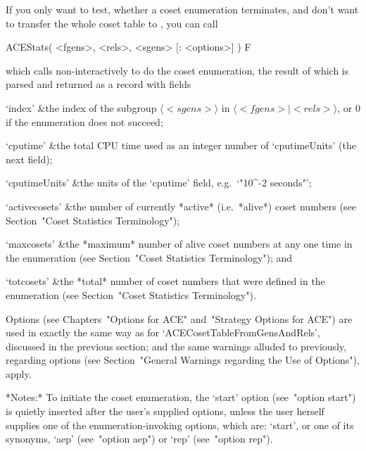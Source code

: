 
If you only want to  test, whether a coset enumeration terminates, and
don't want to  transfer the whole coset table  to {\GAP}, you can call

\>ACEStats( <fgens>, <rels>, <sgens> [: <options>] ) F

which calls {\ACE} non-interactively to do the coset enumeration,  the
result of which is parsed and returned as a {\GAP} record with fields

\beginitems

\quad`index' &the index of the subgroup $\langle <sgens>  \rangle$  in
$\langle <fgens> \mid <rels> \rangle$, or $0$ if the enumeration  does
not succeed;

\quad`cputime' &the total CPU  time  used  as  an  integer  number  of
`cputimeUnits' (the next field);

\quad`cputimeUnits' &the units of the  `cputime'  field,  e.g.~`"10^-2
seconds"';

\quad`activecosets' &the number of currently  *active*  (i.e.~*alive*)
coset numbers (see Section~"Coset Statistics Terminology");

\quad`maxcosets' &the *maximum* number of alive coset numbers  at  any
one  time  in   the   enumeration   (see   Section~"Coset   Statistics
Terminology"); and

\quad`totcosets' &the  *total*  number  of  coset  numbers  that  were
defined   in   the   enumeration   (see   Section~"Coset    Statistics
Terminology").

\enditems

Options (see Chapters~"Options  for  ACE"  and~"Strategy  Options  for
ACE")   are   used    in    exactly    the    same    way    as    for
`ACECosetTableFromGensAndRels', discussed in the previous section; and
the same  warnings  alluded  to  previously,  regarding  options  (see
Section~"General Warnings regarding the Use of Options"), apply.

*Notes:*
To initiate the coset enumeration,  the  `start'  option  (see~"option
start") is quietly inserted after the user's supplied options,  unless
the user herself supplies one  of  the  enumeration-invoking  options,
which are: `start', or one of its synonyms, `aep'  (see~"option  aep")
or `rep' (see~"option rep").

